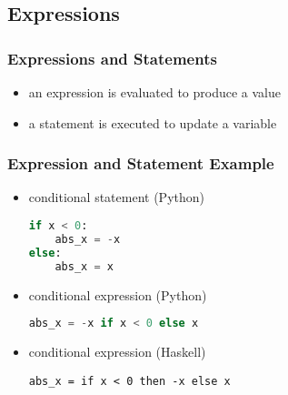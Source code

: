 \documentclass[dvipsnames]{beamer}
\theoremstyle{plain}
\begin{document}
\lstset{language=Haskell}

\subsection{Expressions}

\begin{frame}
  \frametitle{Expressions and Statements}

  \medskip
  \begin{itemize}
    \item an \alert{expression} is evaluated to produce a value

    \medskip
    \item a \alert{statement} is executed to update a variable
  \end{itemize}
\end{frame}

\begin{frame}[fragile]
  \frametitle{Expression and Statement Example}

  \begin{itemize}
    \item conditional statement (Python)
    \begin{lstlisting}[language=Python]
if x < 0:
    abs_x = -x
else:
    abs_x = x
    \end{lstlisting}

    \pause
    \medskip
    \item conditional expression (Python)
    \begin{lstlisting}[language=Python]
abs_x = -x if x < 0 else x
    \end{lstlisting}

    \pause
    \medskip
    \item conditional expression (Haskell)
    \begin{lstlisting}
abs_x = if x < 0 then -x else x
    \end{lstlisting}
  \end{itemize}
\end{frame}
\end{document}
